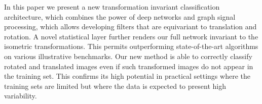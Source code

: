 \documentclass[10pt,journal,compsoc]{IEEEtran}
\begin{document}
	In this paper we present a new transformation invariant classification architecture, which combines the power of deep networks and graph signal processing, which allows developing filters that are equivariant to translation and rotation. A novel statistical layer further renders our full network invariant to the isometric transformations. This permits outperforming state-of-the-art algorithms on various illustrative benchmarks. Our new method is able to correctly classify rotated and translated images even if such transformed images do not appear in the training set. This confirms its high potential in practical settings where the training sets are limited but where the data is expected to present high variability. 
	
	
	
	
	
	
\end{document}
